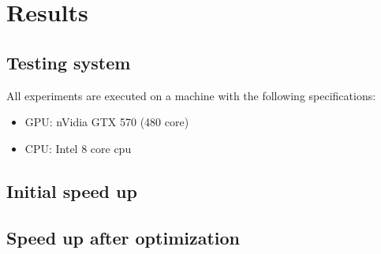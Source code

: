 \section{Results}
\subsection{Testing system} \label{sec:system}
All experiments are executed on a machine with the following specifications:
\begin{itemize}
  \item GPU: nVidia GTX 570 (480 core)
  \item CPU: Intel 8 core cpu
\end{itemize}
\subsection{Initial speed up}
\subsection{Speed up after optimization}
